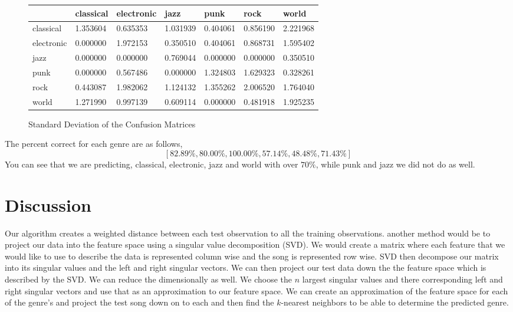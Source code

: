 \documentclass[12pt]{article}
\begin{document}
\begin{figure}[h!]
\centering
 \begin{tabular}{l| |l | l | l | l | l | l | }
&classical &electronic& jazz &punk& rock &world \\ \hline \hline
classical& 1.353604 & 0.635353 & 1.031939 & 0.404061 & 0.856190 & 2.221968 \\ \hline 
electronic& 0.000000 & 1.972153 & 0.350510 & 0.404061 & 0.868731 & 1.595402 \\ \hline 
jazz&0.000000 & 0.000000 & 0.769044 & 0.000000 & 0.000000 & 0.350510 \\ \hline 
punk&0.000000 & 0.567486 & 0.000000 & 1.324803 & 1.629323 & 0.328261 \\ \hline 
rock&0.443087 & 1.982062 & 1.124132 & 1.355262 & 2.006520 & 1.764040 \\ \hline 
world&1.271990 & 0.997139 & 0.609114 & 0.000000 & 0.481918 & 1.925235 \\ \hline 
\end{tabular}
\caption{Standard Deviation of the Confusion Matrices} 
\label{fig:stdconfMat}
\end{figure}

The percent correct for each genre are as follows,
\[ [82.89\%, 80.00\%, 100.00\%, 57.14\%, 48.48\%, 71.43\%] \]
You can see that we are predicting, classical, electronic, jazz  and world with over $70\%$, while punk and jazz we did not do as well. 




\section{Discussion}

Our algorithm creates a weighted distance between each test observation to all the training observations. another method would be to project our data into the feature space using a singular value decomposition (SVD). We would create a matrix where each feature that we would like to use to describe the data is represented column wise and the song is represented row wise. SVD then decompose our matrix into its singular values and the left and right singular vectors. We can then project our test data down the the feature space which is described by the SVD. We can reduce the dimensionally as well. We choose the $n$ largest singular values and there corresponding left and right singular vectors and use that as an approximation to our feature space. We can create an approximation of the feature space for each of the genre's and project the test song down on to each and then find the $k$-nearest neighbors to be able to determine the predicted genre. 




\end{document}

